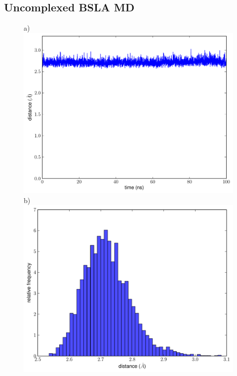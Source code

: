 \documentclass[english, a4paper, 12pt, titlepage, draft]{article}
\begin{document}
\subsection{Uncomplexed BSLA MD}

\begin{figure}
    \begin{minipage}[]{0.45\linewidth}
        \centering
        a)
        \includegraphics[width=\textwidth]{figures/BSLA_solo/BSLA_solo_dist_ASP133_HIS156.pdf} 
        b)
        \includegraphics[width=\textwidth]{figures/BSLA_solo/BSLA_distribution_ASP133_HIS156.pdf} 
    \end{minipage}
\hspace{0.5cm}

\end{figure}
\end{document}
